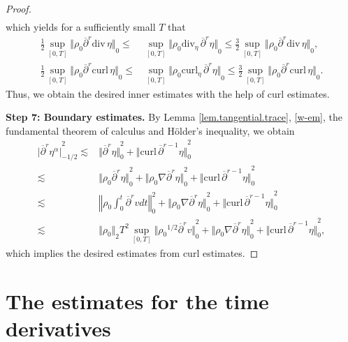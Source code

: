 \documentclass[12pt,twoside,reqno]{amsart}
\numberwithin{equation}{section}
\theoremstyle{definition}
\theoremstyle{remark}
\begin{document}
\begin{proof}
\begin{align}
\end{align}
which yields for a sufficiently small $T$ that
\begin{align}\label{eq.dvequi}
  \frac{1}{2}\sup_{[0,T]}{\Vert{{\rho_0} {\overline{\partial}}^r{\mathrm{div}\,} \eta}\Vert}_0{\leqslant} &\sup_{[0,T]}{\Vert{{\rho_0} {\mathrm{div}_{\!\eta}\,}{\overline{\partial}}^r \eta}\Vert}_0{\leqslant} \frac{3}{2}\sup_{[0,T]}{\Vert{{\rho_0} {\overline{\partial}}^r{\mathrm{div}\,} \eta}\Vert}_0,\\
  \frac{1}{2}\sup_{[0,T]}{\Vert{{\rho_0} {\overline{\partial}}^r{\mathrm{curl}\,} \eta}\Vert}_0{\leqslant} &\sup_{[0,T]}{\Vert{{\rho_0} {\mathrm{curl}_\eta\,}{\overline{\partial}}^r \eta}\Vert}_0{\leqslant} \frac{3}{2}\sup_{[0,T]}{\Vert{{\rho_0} {\overline{\partial}}^r{\mathrm{curl}\,} \eta}\Vert}_0.\label{eq.curlequi}
\end{align}
Thus, we obtain the desired inner estimates with the help of curl estimates.

\textbf{Step 7: Boundary estimates.}
By Lemma \ref{lem.tangential.trace}, \eqref{w-em}, the fundamental theorem of calculus and H\"older's inequality,  we obtain
\begin{align*}
{\vert{{\overline{\partial}}^r \eta^\alpha}\vert}_{-1/2}^2\lesssim& {\Vert{{\overline{\partial}}^r \eta}\Vert}_0^2+{\Vert{{\mathrm{curl}\,}{\overline{\partial}}^{r-1}\eta}\Vert}_0^2\\
  \lesssim &{\Vert{{\rho_0} {\overline{\partial}}^r \eta}\Vert}_0^2+{\Vert{{\rho_0} {\nabla}{\overline{\partial}}^r \eta}\Vert}_0^2+{\Vert{{\mathrm{curl}\,}{\overline{\partial}}^{r-1}\eta}\Vert}_0^2\\
  \lesssim & {\left\Vert{{\rho_0} \int_0^t{\overline{\partial}}^r v dt}\right\Vert}_0^2+{\Vert{{\rho_0} {\nabla} {\overline{\partial}}^r \eta}\Vert}_0^2+{\Vert{{\mathrm{curl}\,}{\overline{\partial}}^{r-1}\eta}\Vert}_0^2\\
  \lesssim &{\Vert{\rho_0}\Vert}_2 T^2\sup_{[0,T]} {\Vert{{\rho_0}^{1/2}{\overline{\partial}}^r v}\Vert}_0^2+{\Vert{{\rho_0} {\nabla}{\overline{\partial}}^r \eta}\Vert}_0^2+{\Vert{{\mathrm{curl}\,} {\overline{\partial}}^{r-1}\eta}\Vert}_0^2,
\end{align*}
which implies the desired estimates from curl estimates.
\end{proof}

\section{The estimates for the time derivatives}\label{sec.2r}
\end{document}
